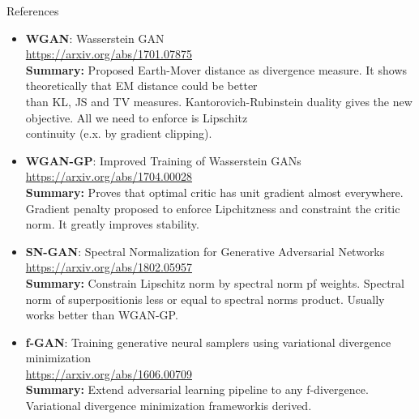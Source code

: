 \documentclass{beamer}
\begin{document}
\begin{frame}{References}
{\scriptsize
\begin{itemize}
	
	\item \textbf{WGAN}: Wasserstein GAN \\
	\href{https://arxiv.org/abs/1701.07875}{https://arxiv.org/abs/1701.07875} \\
	\textbf{Summary:} Proposed Earth-Mover distance as divergence measure. It shows theoretically that EM distance could be better \\ than KL, JS and TV measures. Kantorovich-Rubinstein duality gives the new objective. All we need to enforce is Lipschitz \\ continuity (e.x. by gradient clipping).
	
	\item \textbf{WGAN-GP}: Improved Training of Wasserstein GANs \\
	\href{https://arxiv.org/abs/1704.00028}{https://arxiv.org/abs/1704.00028} \\
	\textbf{Summary:} Proves that optimal critic has unit gradient almost everywhere. Gradient penalty proposed to enforce Lipchitzness and constraint the critic norm. It greatly improves stability.
	
	\item \textbf{SN-GAN}: Spectral Normalization for Generative Adversarial Networks \\
	\href{https://arxiv.org/abs/1802.05957}{https://arxiv.org/abs/1802.05957} \\
	\textbf{Summary:} Constrain Lipschitz norm by spectral norm pf weights. Spectral norm of superpositionis less or equal to spectral norms product. Usually works better than WGAN-GP. 
	
	\item \textbf{f-GAN}:  Training generative neural samplers using variational divergence minimization  \\
	\href{https://arxiv.org/abs/1606.00709}{https://arxiv.org/abs/1606.00709} \\
	\textbf{Summary:} Extend adversarial learning pipeline to any f-divergence. Variational divergence minimization frameworkis derived. 
	
\end{itemize}
}
\end{frame}
\end{document}
